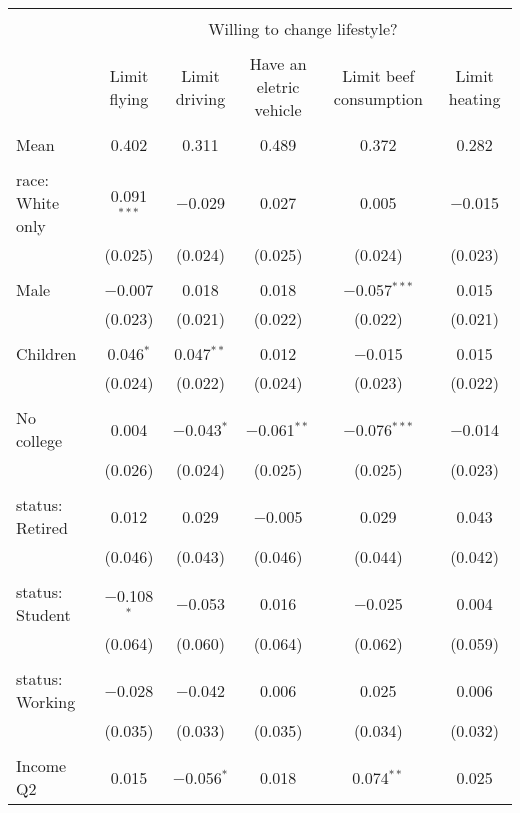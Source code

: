 
\begin{tabular}{@{\extracolsep{5pt}}lccccc} 
\\[-1.8ex]\hline 
\hline \\[-1.8ex] 
 & \multicolumn{5}{c}{Willing to change lifestyle?} \\ 
\cline{2-6} 
\\[-1.8ex] & Limit flying & Limit driving & Have an eletric vehicle & Limit beef consumption & Limit heating \\ 
\hline \\[-1.8ex] 
 Mean & 0.402 & 0.311 & 0.489 & 0.372 & 0.282  \\ \hline \\[-1.8ex] race: White only & 0.091$^{***}$ & $-$0.029 & 0.027 & 0.005 & $-$0.015 \\ 
  & (0.025) & (0.024) & (0.025) & (0.024) & (0.023) \\ 
  & & & & & \\ 
 Male & $-$0.007 & 0.018 & 0.018 & $-$0.057$^{***}$ & 0.015 \\ 
  & (0.023) & (0.021) & (0.022) & (0.022) & (0.021) \\ 
  & & & & & \\ 
 Children & 0.046$^{*}$ & 0.047$^{**}$ & 0.012 & $-$0.015 & 0.015 \\ 
  & (0.024) & (0.022) & (0.024) & (0.023) & (0.022) \\ 
  & & & & & \\ 
 No college & 0.004 & $-$0.043$^{*}$ & $-$0.061$^{**}$ & $-$0.076$^{***}$ & $-$0.014 \\ 
  & (0.026) & (0.024) & (0.025) & (0.025) & (0.023) \\ 
  & & & & & \\ 
 status: Retired & 0.012 & 0.029 & $-$0.005 & 0.029 & 0.043 \\ 
  & (0.046) & (0.043) & (0.046) & (0.044) & (0.042) \\ 
  & & & & & \\ 
 status: Student & $-$0.108$^{*}$ & $-$0.053 & 0.016 & $-$0.025 & 0.004 \\ 
  & (0.064) & (0.060) & (0.064) & (0.062) & (0.059) \\ 
  & & & & & \\ 
 status: Working & $-$0.028 & $-$0.042 & 0.006 & 0.025 & 0.006 \\ 
  & (0.035) & (0.033) & (0.035) & (0.034) & (0.032) \\ 
  & & & & & \\ 
 Income Q2 & 0.015 & $-$0.056$^{*}$ & 0.018 & 0.074$^{**}$ & 0.025 \\ 

\end{tabular}
